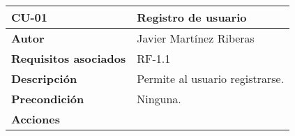\begin{longtable}[H]{@{}ll@{}}
\toprule
\begin{minipage}[b]{0.26\columnwidth}\raggedright\strut%
\textbf{CU-01}\strut
\end{minipage} & \begin{minipage}[b]{0.68\columnwidth}\raggedright\strut%
\textbf{Registro de usuario}\strut
\end{minipage}\tabularnewline
\midrule
\endhead
\begin{minipage}[t]{0.26\columnwidth}\raggedright\strut
\textbf{Autor}\strut
\end{minipage} & \begin{minipage}[t]{0.68\columnwidth}\raggedright\strut
Javier Martínez Riberas\strut
\end{minipage}\tabularnewline
\begin{minipage}[t]{0.26\columnwidth}\raggedright\strut
\textbf{Requisitos asociados}\strut
\end{minipage} & \begin{minipage}[t]{0.68\columnwidth}\raggedright\strut%
RF-1.1\strut
\end{minipage}\tabularnewline
\begin{minipage}[t]{0.26\columnwidth}\raggedright\strut
\textbf{Descripción}\strut
\end{minipage} & \begin{minipage}[t]{0.68\columnwidth}\raggedright\strut%
Permite al usuario registrarse.\strut
\end{minipage}\tabularnewline
\begin{minipage}[t]{0.26\columnwidth}\raggedright\strut
\textbf{Precondición}\strut
\end{minipage} & \begin{minipage}[t]{0.68\columnwidth}\raggedright\strut%
Ninguna.\strut
\end{minipage}\tabularnewline
\begin{minipage}[t]{0.26\columnwidth}\raggedright\strut
\textbf{Acciones}\strut
\end{minipage} & \begin{minipage}[t]{0.68\columnwidth}\raggedright\strut%

\end{minipage}
\end{longtable}
